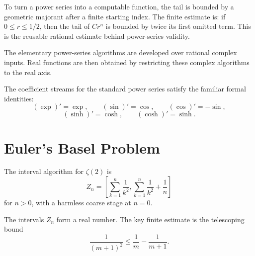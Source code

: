 \begin{definition}
\label{def:power-series-geometric-majorant}
To turn a power series into a computable function, the tail is bounded by a
geometric majorant after a finite starting index.  The finite estimate is:
if \(0\le r\le 1/2\), then the tail of \(Cr^n\) is bounded by twice its first
omitted term.  This is the reusable rational estimate behind power-series
validity.
\end{definition}

\begin{definition}
\label{def:complex-power-series-evaluators}
The elementary power-series algorithms are developed over rational complex
inputs.  Real functions are then obtained by restricting these complex
algorithms to the real axis.
\end{definition}

\begin{theorem}\label{thm:formal-derivative-table}
\leanok
The coefficient streams for the standard power series satisfy the familiar
formal identities:
\[
  (\exp)'=\exp,\qquad
  (\sin)'=\cos,\qquad
  (\cos)'=-\sin,
\]
\[
  (\sinh)'=\cosh,\qquad
  (\cosh)'=\sinh.
\]
\end{theorem}

\section{Euler's Basel Problem}

\begin{definition}\label{def:zeta-two-raw}
The interval algorithm for \(\zeta(2)\) is
\[
  Z_n=
  \left[
    \sum_{k=1}^{n}\frac1{k^2},
    \sum_{k=1}^{n}\frac1{k^2}+\frac1n
  \right]
\]
for \(n>0\), with a harmless coarse stage at \(n=0\).
\end{definition}

\begin{theorem}\label{thm:zeta-two-valid}
\leanok
The intervals \(Z_n\) form a real number.  The key finite estimate is the
telescoping bound
\[
  \frac{1}{(m+1)^2}\le \frac1m-\frac1{m+1}.
\]
\end{theorem}

